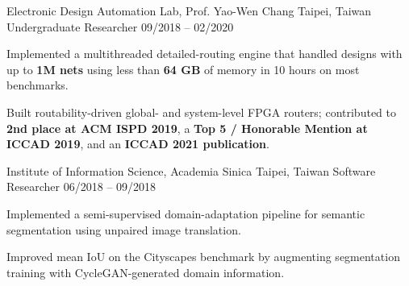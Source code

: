 \begin{cventries}
\cventry
  {Electronic Design Automation Lab, Prof. Yao-Wen Chang}
  {Taipei, Taiwan}
  {Undergraduate Researcher}
  {09/2018 -- 02/2020}
  {
  \vspace{-3.5mm}
  \item {}
  \begin{cvitems}
    \item Implemented a multithreaded detailed-routing engine that handled designs with up to \textbf{1M nets} using less than \textbf{64 GB} of memory in 10 hours on most benchmarks.
    \item Built routability-driven global- and system-level FPGA routers; contributed to \textbf{2nd place at ACM ISPD 2019}, a \textbf{Top 5 / Honorable Mention at ICCAD 2019}, and an \textbf{ICCAD 2021 publication}.
  \end{cvitems}
  }

\cventry
  {Institute of Information Science, Academia Sinica}
  {Taipei, Taiwan}
  {Software Researcher}
  {06/2018 -- 09/2018}
  {
    \vspace{-3.5mm}
    \begin{cvitems}
      \item {Implemented a semi-supervised domain-adaptation pipeline for semantic segmentation using unpaired image translation.}
      \item {Improved mean IoU on the Cityscapes benchmark by augmenting segmentation training with CycleGAN-generated domain information.}
    \end{cvitems}
  }

\end{cventries}
